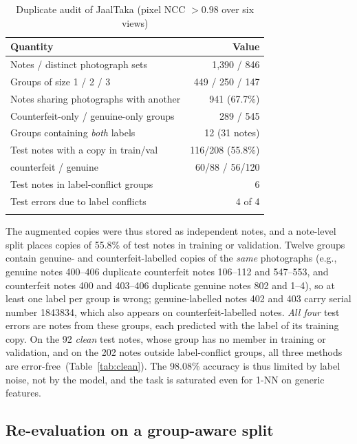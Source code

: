 \documentclass[pdflatex,iicol,sn-mathphys-num]{sn-jnl}
\begin{document}
\begin{table}[!t]
\caption{Duplicate audit of JaalTaka (pixel NCC $>0.98$ over six views)}\label{tab:audit}
\footnotesize
\begin{tabular*}{\columnwidth}{@{\extracolsep\fill}lr}
\toprule
Quantity & Value \\
\midrule
Notes / distinct photograph sets & 1{,}390 / 846 \\
Groups of size 1 / 2 / 3 & 449 / 250 / 147 \\
Notes sharing photographs with another & 941 (67.7\%) \\
Counterfeit-only / genuine-only groups & 289 / 545 \\
Groups containing \emph{both} labels & 12 (31 notes) \\
\midrule
Test notes with a copy in train/val & 116/208 (55.8\%) \\
\quad counterfeit / genuine & 60/88 / 56/120 \\
Test notes in label-conflict groups & 6 \\
Test errors due to label conflicts & 4 of 4 \\
\botrule
\end{tabular*}
\end{table}

The augmented copies were thus stored as independent notes, and a note-level split
places copies of 55.8\% of test notes in training or validation. Twelve groups contain
genuine- and counterfeit-labelled copies of the \emph{same} photographs (e.g., genuine
notes 400--406 duplicate counterfeit notes 106--112 and 547--553, and counterfeit notes
400 and 403--406 duplicate genuine notes 802 and 1--4), so at least one label per group
is wrong; genuine-labelled notes 402 and 403 carry serial number 1843834, which also
appears on counterfeit-labelled notes. \emph{All four} test errors are notes from these
groups, each predicted with the label of its training copy. On the 92 \emph{clean} test
notes, whose group has no member in training or validation, and on the 202 notes outside
label-conflict groups, all three methods are error-free~(Table~\ref{tab:clean}). The
98.08\% accuracy is thus limited by label noise, not by the model, and the task is
saturated even for 1-NN on generic features.

\subsection{Re-evaluation on a group-aware split}\label{sec:groupsplit}
\end{document}
